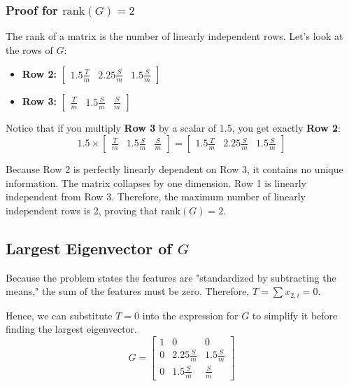 \documentclass[twoside, 10pt]{article}
\begin{document}
\subsubsection{Proof for $\text{rank}(G) = 2$}
The rank of a matrix is the number of linearly independent rows. Let's look at the rows of $G$:
\begin{itemize}
    \item \textbf{Row 2:} $\begin{bmatrix} 1.5\frac{T}{m} & 2.25\frac{S}{m} & 1.5\frac{S}{m} \end{bmatrix}$
    \item \textbf{Row 3:} $\begin{bmatrix} \frac{T}{m} & 1.5\frac{S}{m} & \frac{S}{m} \end{bmatrix}$
\end{itemize}

Notice that if you multiply \textbf{Row 3} by a scalar of $1.5$, you get exactly \textbf{Row 2}:
\[
1.5 \times \begin{bmatrix} \frac{T}{m} & 1.5\frac{S}{m} & \frac{S}{m} \end{bmatrix} = \begin{bmatrix} 1.5\frac{T}{m} & 2.25\frac{S}{m} & 1.5\frac{S}{m} \end{bmatrix}
\]

Because Row 2 is perfectly linearly dependent on Row 3, it contains no unique information. The matrix collapses by one dimension. Row 1 is linearly independent from Row 3. Therefore, the maximum number of linearly independent rows is 2, proving that $\text{rank}(G) = 2$.

\subsection{Largest Eigenvector of $G$}
Because the problem states the features are "standardized by subtracting the means," the sum of the features must be zero. Therefore, $T = \sum x_{2,i} = 0$.

Hence, we can substitute $T=0$ into the expression for $G$ to simplify it before finding the largest eigenvector.
\[
G = \begin{bmatrix} 
1 & 0 & 0 \\[6pt]
0 & 2.25\frac{S}{m} & 1.5\frac{S}{m} \\[6pt]
0 & 1.5\frac{S}{m} & \frac{S}{m} 
\end{bmatrix}
\]
\end{document}
